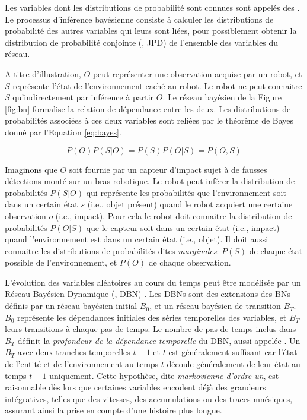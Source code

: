 Les variables dont les distributions de probabilité sont connues sont appelés des . 
Le processus d'inférence bayésienne consiste à calculer les distributions de probabilité des autres variables qui leurs sont liées, pour possiblement obtenir la distribution de probabilité conjointe  (, JPD) de l'ensemble des variables du réseau.  

A titre d'illustration, $O$ peut représenter une observation acquise par un robot, et $S$ représente l'état de l'environnement caché au robot.
Le robot ne peut connaitre $S$ qu'indirectement par inférence à partir $O$.
Le réseau bayésien de la Figure \ref{fig:bn} formalise la relation de dépendance entre les deux.
Les distributions de probabilités associées à ces deux variables sont reliées par le théorème de Bayes donné par l'Equation \eqref{eq:bayes}. 

\begin{equation}
	\label{eq:bayes}
	P (O) P(S|O) = P(S)P(O|S) = P (O, S) 
\end{equation} 

Imaginons que $O$ soit fournie par un capteur d'impact sujet à de fausses détections monté sur un bras robotique.
Le robot peut inférer la distribution de probabilités $P(S|O)$ qui représente les probabilités que l'environnement soit dans un certain état $s$ (i.e., objet présent) quand le robot acquiert une certaine observation $o$ (i.e., impact).
Pour cela le robot doit connaitre la distribution de probabilités $P(O|S)$ que le capteur soit dans un certain état (i.e., impact) quand l'environnement est dans un certain état (i.e., objet). 
Il doit aussi connaitre les distributions de probabilités dites \emph{marginales}: $P(S)$ de chaque état possible de l'environnement, et $P(O)$ de chaque observation.


L'évolution des variables aléatoires au cours du temps peut être modélisée par un Réseau Bayésien Dynamique (, DBN) \cite{murphy_dynamic_2002}. 
Les DBNs sont des extensions des BNs définis par un réseau bayésien initial  $B_0$, et un réseau bayésien de transition $B_T$.
$B_0$ représente les dépendances initiales des séries temporelles des variables, et $B_T$ leurs transitions à chaque pas de temps.
Le nombre de pas de temps inclus dans $B_T$ définit la \emph{profondeur de la dépendance temporelle} du DBN, aussi appelée .
Un $B_T$ avec deux tranches temporelles $t-1$ et $t$ est généralement suffisant car l'état de l'entité et de l'environnement au temps $t$ découle généralement de leur état au temps $t-1$ uniquement.
Cette hypothèse, dite \emph{markovienne d’ordre un}, est raisonnable dès lors que certaines variables encodent déjà des grandeurs intégratives, telles que des vitesses, des accumulations ou des traces mnésiques, assurant ainsi la prise en compte d’une histoire plus longue.

